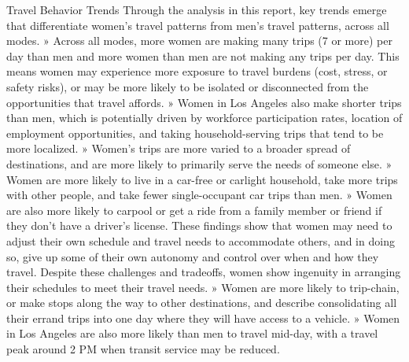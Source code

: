 \documentclass[
  12pt,
]{article}
\begin{document}
\begin{flushleft}
Travel Behavior Trends
Through the analysis in this report, key trends
emerge that differentiate women’s travel patterns
from men’s travel patterns, across all modes. » Across all modes, more women are making many
trips (7 or more) per day than men and more
women than men are not making any trips per day.
This means women may experience more exposure
to travel burdens (cost, stress, or safety risks), or
may be more likely to be isolated or disconnected
from the opportunities that travel affords.
» Women in Los Angeles also make shorter trips
than men, which is potentially driven by workforce
participation rates, location of employment
opportunities, and taking household-serving trips
that tend to be more localized.
» Women’s trips are more varied to a broader spread
of destinations, and are more likely to primarily
serve the needs of someone else.
» Women are more likely to live in a car-free or carlight household, take more trips with other people,
and take fewer single-occupant car trips than men.
» Women are also more likely to carpool or get a ride
from a family member or friend if they don’t have
a driver’s license.
These findings show that women may need to adjust
their own schedule and travel needs to accommodate
others, and in doing so, give up some of their own
autonomy and control over when and how they travel.
Despite these challenges and tradeoffs,
women show ingenuity in arranging their
schedules to meet their travel needs. » Women are more likely to trip-chain, or make
stops along the way to other destinations, and
describe consolidating all their errand trips into
one day where they will have access to a vehicle.
» Women in Los Angeles are also more likely than
men to travel mid-day, with a travel peak around 2
PM when transit service may be reduced.


\end{flushleft}
\end{document}
